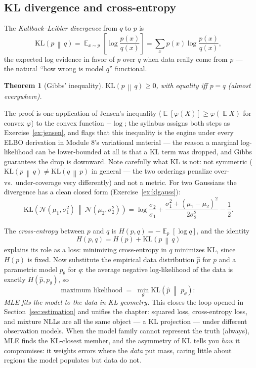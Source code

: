 \documentclass[11pt]{article}
\numberwithin{equation}{section}
\theoremstyle{plain}
\newtheorem{theorem}{Theorem}[section]
\theoremstyle{definition}
\theoremstyle{remark}
\DeclareMathOperator{\E}{\mathbb{E}}
\newcommand{\KL}[2]{\mathrm{KL}\!\left(#1 \,\middle\|\, #2\right)}
\newcommand{\Normal}{\mathcal{N}}
\begin{document}
\subsection{KL divergence and cross-entropy}

The \emph{Kullback--Leibler divergence} from $q$ to $p$ is
\begin{equation}
\KL{p}{q} = \E_{x \sim p}\!\left[\log \frac{p(x)}{q(x)}\right]
= \sum_x p(x) \log \frac{p(x)}{q(x)} ,
\end{equation}
the expected log evidence in favor of $p$ over $q$ when data really come from $p$ --- the natural ``how wrong is model $q$'' functional.

\begin{theorem}[Gibbs' inequality]\label{thm:gibbs}
$\KL{p}{q} \ge 0$, with equality iff $p = q$ (almost everywhere).
\end{theorem}

The proof is one application of Jensen's inequality ($\E[\varphi(X)] \ge \varphi(\E X)$ for convex $\varphi$) to the convex function $-\log$; the syllabus assigns both steps as Exercise~\ref{ex:jensen}, and flags that this inequality is the engine under every ELBO derivation in Module 8's variational material --- the reason a marginal log-likelihood can be lower-bounded at all is that a KL term was dropped, and Gibbs guarantees the drop is downward. Note carefully what KL is not: not symmetric ($\KL{p}{q} \ne \KL{q}{p}$ in general --- the two orderings penalize over- vs.\ under-coverage very differently) and not a metric. For two Gaussians the divergence has a clean closed form (Exercise~\ref{ex:klgauss}):
\begin{equation}
\KL{\Normal(\mu_1,\sigma_1^2)}{\Normal(\mu_2,\sigma_2^2)}
= \log\frac{\sigma_2}{\sigma_1} + \frac{\sigma_1^2 + (\mu_1 - \mu_2)^2}{2\sigma_2^2} - \frac12 .
\end{equation}

The \emph{cross-entropy} between $p$ and $q$ is $H(p, q) = -\E_{p}[\log q]$, and the identity
\begin{equation}
H(p, q) = H(p) + \KL{p}{q}
\label{eq:crossent}
\end{equation}
explains its role as a loss: minimizing cross-entropy in $q$ minimizes KL, since $H(p)$ is fixed. Now substitute the empirical data distribution $\hat p$ for $p$ and a parametric model $p_\theta$ for $q$: the average negative log-likelihood of the data is exactly $H(\hat p, p_\theta)$, so
\begin{equation}
\text{maximum likelihood} \;=\; \min_\theta \KL{\hat p}{\,p_\theta} :
\end{equation}
\emph{MLE fits the model to the data in KL geometry.} This closes the loop opened in Section~\ref{sec:estimation} and unifies the chapter: squared loss, cross-entropy loss, and mixture NLLs are all the same object --- a KL projection --- under different observation models. When the model family cannot represent the truth (always), MLE finds the KL-closest member, and the asymmetry of KL tells you \emph{how} it compromises: it weights errors where the \emph{data} put mass, caring little about regions the model populates but data do not.
\end{document}
